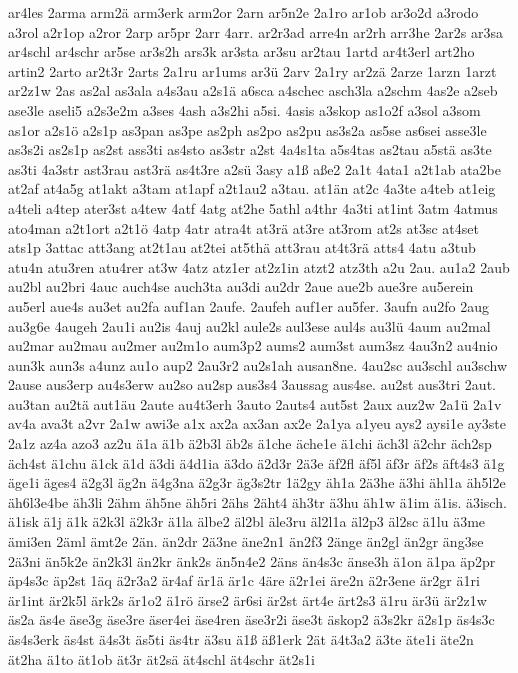 {ar4les
2arma
arm2ä
arm3erk
arm2or
2arn
ar5n2e
2a1ro
ar1ob
ar3o2d
a3rodo
a3rol
a2r1op
a2ror
2arp
ar5pr
2arr
4arr.
ar2r3ad
arre4n
ar2rh
arr3he
2ar2s
ar3sa
ar4schl
ar4schr
ar5se
ar3s2h
ars3k
ar3sta
ar3su
ar2tau
1artd
ar4t3erl
art2ho
artin2
2arto
ar2t3r
2arts
2a1ru
ar1ums
ar3ü
2arv
2a1ry
ar2zä
2arze
1arzn
1arzt
ar2z1w
2as
as2al
as3ala
a4s3au
a2s1ä
a6sca
a4schec
asch3la
a2schm
4as2e
a2seb
ase3le
aseli5
a2s3e2m
a3ses
4ash
a3s2hi
a5si.
4asis
a3skop
as1o2f
a3sol
a3som
as1or
a2s1ö
a2s1p
as3pan
as3pe
as2ph
as2po
as2pu
as3s2a
as5se
as6sei
asse3le
as3s2i
as2s1p
as2st
ass3ti
as4sto
as3str
a2st
4a4s1ta
a5s4tas
as2tau
a5stä
as3te
as3ti
4a3str
ast3rau
ast3rä
as4t3re
a2sü
3asy
a1ß
aße2
2a1t
4ata1
a2t1ab
ata2be
at2af
at4a5g
at1akt
a3tam
at1apf
a2t1au2
a3tau.
at1än
at2c
4a3te
a4teb
at1eig
a4teli
a4tep
ater3st
a4tew
4atf
4atg
at2he
5athl
a4thr
4a3ti
at1int
3atm
4atmus
ato4man
a2t1ort
a2t1ö
4atp
4atr
atra4t
at3rä
at3re
at3rom
at2s
at3sc
at4set
ats1p
3attac
att3ang
at2t1au
at2tei
at5thä
att3rau
at4t3rä
atts4
4atu
a3tub
atu4n
atu3ren
atu4rer
at3w
4atz
atz1er
at2z1in
atzt2
atz3th
a2u
2au.
au1a2
2aub
au2bl
au2bri
4auc
auch4se
auch3ta
au3di
au2dr
2aue
aue2b
aue3re
au5erein
au5erl
aue4s
au3et
au2fa
auf1an
2aufe.
2aufeh
auf1er
au5fer.
3aufn
au2fo
2aug
au3g6e
4augeh
2au1i
au2is
4auj
au2kl
aule2s
aul3ese
aul4s
au3lü
4aum
au2mal
au2mar
au2mau
au2mer
au2m1o
aum3p2
aums2
aum3st
aum3sz
4au3n2
au4nio
aun3k
aun3s
a4unz
au1o
aup2
2au3r2
au2s1ah
ausan8ne.
4au2sc
au3schl
au3schw
2ause
aus3erp
au4s3erw
au2so
au2sp
aus3s4
3aussag
aus4se.
au2st
aus3tri
2aut.
au3tan
au2tä
aut1äu
2aute
au4t3erh
3auto
2auts4
aut5st
2aux
auz2w
2a1ü
2a1v
av4a
ava3t
a2vr
2a1w
awi3e
a1x
ax2a
ax3an
ax2e
2a1ya
a1yeu
ays2
aysi1e
ay3ste
2a1z
az4a
azo3
az2u
ä1a
ä1b
ä2b3l
äb2s
ä1che
äche1e
ä1chi
äch3l
ä2chr
äch2sp
äch4st
ä1chu
ä1ck
ä1d
ä3di
ä4d1ia
ä3do
ä2d3r
2ä3e
äf2fl
äf5l
äf3r
äf2s
äft4s3
ä1g
äge1i
äges4
ä2g3l
äg2n
ä4g3na
ä2g3r
äg3s2tr
1ä2gy
äh1a
2ä3he
ä3hi
ähl1a
äh5l2e
äh6l3e4be
äh3li
2ähm
äh5ne
äh5ri
2ähs
2äht4
äh3tr
ä3hu
äh1w
ä1im
ä1is.
ä3isch.
ä1isk
ä1j
ä1k
ä2k3l
ä2k3r
ä1la
älbe2
äl2bl
äle3ru
äl2l1a
äl2p3
äl2sc
ä1lu
ä3me
ämi3en
2äml
ämt2e
2än.
än2dr
2ä3ne
äne2n1
än2f3
2änge
än2gl
än2gr
äng3se
2ä3ni
än5k2e
än2k3l
än2kr
änk2s
än5n4e2
2äns
än4s3c
änse3h
ä1on
ä1pa
äp2pr
äp4s3c
äp2st
1äq
ä2r3a2
är4af
är1ä
är1c
4äre
ä2r1ei
äre2n
ä2r3ene
är2gr
ä1ri
är1int
är2k5l
ärk2s
är1o2
ä1rö
ärse2
är6si
är2st
ärt4e
ärt2s3
ä1ru
är3ü
är2z1w
äs2a
äs4e
äse3g
äse3re
äser4ei
äse4ren
äse3r2i
äse3t
äskop2
ä3s2kr
ä2s1p
äs4s3c
äs4s3erk
äs4st
ä4s3t
äs5ti
äs4tr
ä3su
ä1ß
äß1erk
2ät
ä4t3a2
ä3te
äte1i
äte2n
ät2ha
ä1to
ät1ob
ät3r
ät2sä
ät4schl
ät4schr
ät2s1i
}
